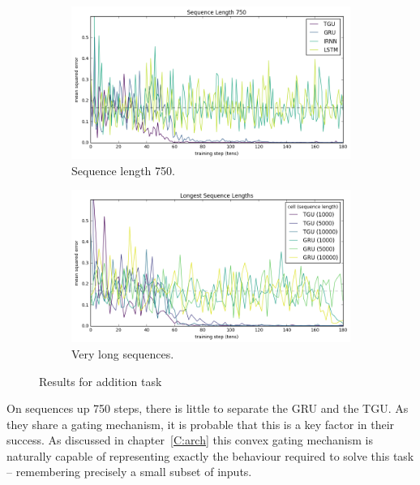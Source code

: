 \begin{figure}[ht]
\centering
\begin{subfigure}[t]{0.75\textwidth}
\includegraphics[width=\textwidth]{exps/addition/sl750}
\caption{Sequence length 750.}
\label{fig:add750}
\end{subfigure}

\begin{subfigure}[t]{0.75\textwidth}
\centering
\includegraphics[width=\textwidth]{exps/addition/long}
\caption{Very long sequences.}
\label{fig:addlong}
\end{subfigure}

\caption{Results for addition task}
\label{fig:addresults}
\end{figure}

On sequences up 750 steps, there is little to separate the GRU and the TGU. As they share a gating
mechanism, it is probable that this is a key factor in their success. As discussed in
chapter~\ref{C:arch} this convex gating mechanism is naturally capable of representing exactly the
behaviour required to solve this task -- remembering precisely a small subset of inputs.


